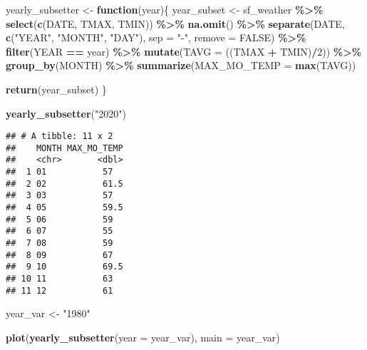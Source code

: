 \documentclass[
]{article}
\newenvironment{Shaded}{\begin{snugshade}}{\end{snugshade}}
\newcommand{\AttributeTok}[1]{\textcolor[rgb]{0.13,0.29,0.53}{#1}}
\newcommand{\ConstantTok}[1]{\textcolor[rgb]{0.56,0.35,0.01}{#1}}
\newcommand{\ControlFlowTok}[1]{\textcolor[rgb]{0.13,0.29,0.53}{\textbf{#1}}}
\newcommand{\DecValTok}[1]{\textcolor[rgb]{0.00,0.00,0.81}{#1}}
\newcommand{\FunctionTok}[1]{\textcolor[rgb]{0.13,0.29,0.53}{\textbf{#1}}}
\newcommand{\NormalTok}[1]{#1}
\newcommand{\OtherTok}[1]{\textcolor[rgb]{0.56,0.35,0.01}{#1}}
\newcommand{\SpecialCharTok}[1]{\textcolor[rgb]{0.81,0.36,0.00}{\textbf{#1}}}
\newcommand{\StringTok}[1]{\textcolor[rgb]{0.31,0.60,0.02}{#1}}
\begin{document}
\begin{Shaded}
\begin{Highlighting}[]
\NormalTok{yearly\_subsetter }\OtherTok{\textless{}{-}} \ControlFlowTok{function}\NormalTok{(year)\{}
\NormalTok{  year\_subset }\OtherTok{\textless{}{-}}\NormalTok{ sf\_weather }\SpecialCharTok{\%\textgreater{}\%}
  \FunctionTok{select}\NormalTok{(}\FunctionTok{c}\NormalTok{(DATE, TMAX, TMIN)) }\SpecialCharTok{\%\textgreater{}\%} 
  \FunctionTok{na.omit}\NormalTok{() }\SpecialCharTok{\%\textgreater{}\%}
  \FunctionTok{separate}\NormalTok{(DATE, }\FunctionTok{c}\NormalTok{(}\StringTok{"YEAR"}\NormalTok{, }\StringTok{"MONTH"}\NormalTok{, }\StringTok{"DAY"}\NormalTok{), }\AttributeTok{sep =} \StringTok{"{-}"}\NormalTok{, }\AttributeTok{remove =} \ConstantTok{FALSE}\NormalTok{) }\SpecialCharTok{\%\textgreater{}\%}
  \FunctionTok{filter}\NormalTok{(YEAR }\SpecialCharTok{==}\NormalTok{ year) }\SpecialCharTok{\%\textgreater{}\%}
  \FunctionTok{mutate}\NormalTok{(}\AttributeTok{TAVG =}\NormalTok{ ((TMAX }\SpecialCharTok{+}\NormalTok{ TMIN)}\SpecialCharTok{/}\DecValTok{2}\NormalTok{)) }\SpecialCharTok{\%\textgreater{}\%}
  \FunctionTok{group\_by}\NormalTok{(MONTH) }\SpecialCharTok{\%\textgreater{}\%}
  \FunctionTok{summarize}\NormalTok{(}\AttributeTok{MAX\_MO\_TEMP =} \FunctionTok{max}\NormalTok{(TAVG))}
  
  \FunctionTok{return}\NormalTok{(year\_subset)}
\NormalTok{\}}

\FunctionTok{yearly\_subsetter}\NormalTok{(}\StringTok{"2020"}\NormalTok{)}
\end{Highlighting}
\end{Shaded}

\begin{verbatim}
## # A tibble: 11 x 2
##    MONTH MAX_MO_TEMP
##    <chr>       <dbl>
##  1 01           57  
##  2 02           61.5
##  3 03           57  
##  4 05           59.5
##  5 06           59  
##  6 07           55  
##  7 08           59  
##  8 09           67  
##  9 10           69.5
## 10 11           63  
## 11 12           61
\end{verbatim}

\begin{Shaded}
\begin{Highlighting}[]
\NormalTok{year\_var }\OtherTok{\textless{}{-}} \StringTok{"1980"}

\FunctionTok{plot}\NormalTok{(}\FunctionTok{yearly\_subsetter}\NormalTok{(}\AttributeTok{year =}\NormalTok{ year\_var), }\AttributeTok{main =}\NormalTok{ year\_var)}
\end{Highlighting}
\end{Shaded}
\end{document}
